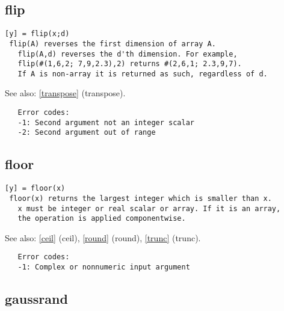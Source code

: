 \documentclass[a4paper]{article}
\begin{document}
\subsection{flip\label{flip}}

\begin{tscreen}
\begin{verbatim}
[y] = flip(x;d)
 flip(A) reverses the first dimension of array A.
   flip(A,d) reverses the d'th dimension. For example,
   flip(#(1,6,2; 7,9,2.3),2) returns #(2,6,1; 2.3,9,7).
   If A is non-array it is returned as such, regardless of d.
\end{verbatim}

See also: \ref{transpose} {(transpose)}.
\begin{verbatim}
   Error codes:
   -1: Second argument not an integer scalar
   -2: Second argument out of range 
\end{verbatim}
\end{tscreen}



\subsection{floor\label{floor}}

\begin{tscreen}
\begin{verbatim}
[y] = floor(x)
 floor(x) returns the largest integer which is smaller than x.
   x must be integer or real scalar or array. If it is an array,
   the operation is applied componentwise.
\end{verbatim}

See also: \ref{ceil} {(ceil)}, \ref{round} {(round)}, \ref{trunc} {(trunc)}.
\begin{verbatim}
   Error codes:
   -1: Complex or nonnumeric input argument 
\end{verbatim}
\end{tscreen}



\subsection{gaussrand\label{gaussrand}}
\end{document}
